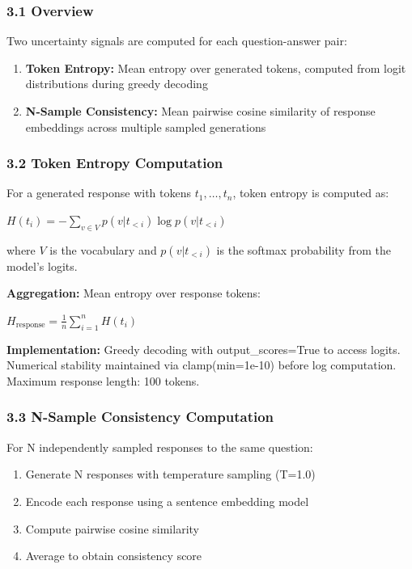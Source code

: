 
\subsubsection{3.1 Overview}

Two uncertainty signals are computed for each question-answer pair:

\begin{enumerate}
\item \textbf{Token Entropy:} Mean entropy over generated tokens, computed from logit distributions during greedy decoding
\item \textbf{N-Sample Consistency:} Mean pairwise cosine similarity of response embeddings across multiple sampled generations
\end{enumerate}

\subsubsection{3.2 Token Entropy Computation}

For a generated response with tokens $t_1, \ldots, t_n$, token entropy is computed as:

$H(t_{i}) = -\sum_{v \in V} p(v | t_{<i}) \log p(v | t_{<i})$

where $V$ is the vocabulary and $p(v | t_{<i})$ is the softmax probability from the model's logits.

\textbf{Aggregation:} Mean entropy over response tokens:

$H_{\text{response}} = \frac{1}{n} \sum_{i=1}^{n} H(t_{i})$

\textbf{Implementation:} Greedy decoding with output\_scores=True to access logits. Numerical stability maintained via clamp(min=1e-10) before log computation. Maximum response length: 100 tokens.

\subsubsection{3.3 N-Sample Consistency Computation}

For N independently sampled responses to the same question:

\begin{enumerate}
\item Generate N responses with temperature sampling (T=1.0)
\item Encode each response using a sentence embedding model
\item Compute pairwise cosine similarity
\item Average to obtain consistency score
\end{enumerate}


